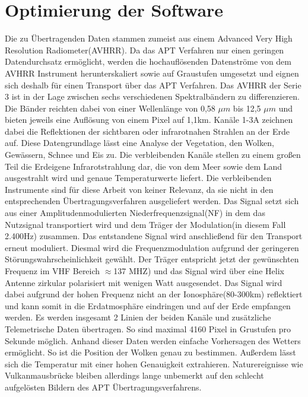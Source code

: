 \section[]{Optimierung der Software}
\begin{multicols*}{2}
    Die zu Übertragenden Daten stammen zumeist aus einem \glqq Advanced Very High Resolution Radiometer\grqq (AVHRR). Da das APT Verfahren nur einen geringen Datendurchsatz ermöglicht, werden die hochauflösenden Datenströme von dem AVHRR Instrument herunterskaliert sowie auf Graustufen umgesetzt und eignen sich deshalb für einen Transport über das APT Verfahren.  Das AVHRR der Serie 3 ist in der Lage zwischen sechs verschiedenen Spektralbändern zu differenzieren. Die Bänder reichten dabei von einer Wellenlänge von 0,58 \( \mu m\) bis 12,5 \( \mu m\) und bieten jeweils eine Auflösung von einem Pixel auf 1,1km. Kanäle 1-3A zeichnen dabei die Reflektionen der sichtbaren oder infrarotnahen Strahlen an der Erde auf. Diese Datengrundlage lässt eine Analyse der Vegetation, den Wolken, Gewässern, Schnee und Eis zu. Die verbleibenden Kanäle stellen zu einem großen Teil die Erdeigene Infrarotstrahlung dar, die von dem Meer sowie dem Land ausgestrahlt wird und genaue Temperaturwerte liefert. Die verbleibenden Instrumente sind für diese Arbeit von keiner Relevanz, da sie nicht in den entsprechenden Übertragungsverfahren ausgeliefert werden. 
    \cite{Apt-System} 
    Das Signal setzt sich aus einer Amplitudenmodulierten Niederfrequenzsignal(NF) in dem das Nutzsignal transportiert wird und dem Träger der Modulation(in diesem Fall 2.400Hz) zusammen. Das entstandene Signal wird anschließend für den Transport erneut moduliert. Diesmal wird die Frequenzmodulation aufgrund der geringeren Störungswahrscheinlichkeit gewählt. Der Träger entspricht jetzt der gewünschten Frequenz im VHF Bereich \( \approx  \)137 MHZ) und das Signal wird über eine Helix Antenne zirkular polarisiert mit wenigen Watt ausgesendet. Das Signal wird dabei aufgrund der hohen Frequenz nicht an der Ionosphäre(80-300km) reflektiert und kann somit in die Erdatmosphäre eindringen und auf der Erde empfangen werden. Es werden insgesamt 2 Linien der beiden Kanäle und zusätzliche Telemetrische Daten übertragen. So sind maximal 4160 Pixel in Grustufen pro Sekunde möglich. Anhand dieser Daten werden einfache Vorhersagen des Wetters ermöglicht. So ist die Position der Wolken genau zu bestimmen. Außerdem lässt sich die Temperatur mit einer hohen Genauigkeit extrahieren. Naturereignisse wie Vulkanmausbrücke bleiben allerdings lange unbemerkt auf den schlecht aufgelösten Bildern des APT Übertragungsverfahrens. 

\end{multicols*}
